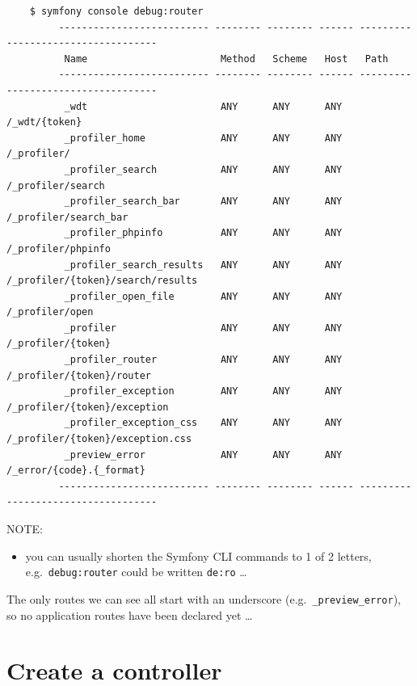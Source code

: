 \documentclass[a4paperpaper,openright]{book}
\providecommand{\tightlist}{%
  \setlength{\itemsep}{0pt}\setlength{\parskip}{0pt}}
\begin{document}
\begin{verbatim}
    $ symfony console debug:router
         -------------------------- -------- -------- ------ ----------------------------------- 
          Name                       Method   Scheme   Host   Path                               
         -------------------------- -------- -------- ------ ----------------------------------- 
          _wdt                       ANY      ANY      ANY    /_wdt/{token}                      
          _profiler_home             ANY      ANY      ANY    /_profiler/                        
          _profiler_search           ANY      ANY      ANY    /_profiler/search                  
          _profiler_search_bar       ANY      ANY      ANY    /_profiler/search_bar              
          _profiler_phpinfo          ANY      ANY      ANY    /_profiler/phpinfo                 
          _profiler_search_results   ANY      ANY      ANY    /_profiler/{token}/search/results  
          _profiler_open_file        ANY      ANY      ANY    /_profiler/open                    
          _profiler                  ANY      ANY      ANY    /_profiler/{token}                 
          _profiler_router           ANY      ANY      ANY    /_profiler/{token}/router          
          _profiler_exception        ANY      ANY      ANY    /_profiler/{token}/exception       
          _profiler_exception_css    ANY      ANY      ANY    /_profiler/{token}/exception.css   
          _preview_error             ANY      ANY      ANY    /_error/{code}.{_format}           
         -------------------------- -------- -------- ------ ----------------------------------- 

\end{verbatim}

NOTE:

\begin{itemize}
\tightlist
\item
  you can usually shorten the Symfony CLI commands to 1 of 2 letters,
  e.g.~\texttt{debug:router} could be written \texttt{de:ro} \ldots{}
\end{itemize}

The only routes we can see all start with an underscore
(e.g.~\texttt{\_preview\_error}), so no application routes have been
declared yet \ldots{}

\hypertarget{create-a-controller}{%
\section{Create a controller}\label{create-a-controller}}
\end{document}
